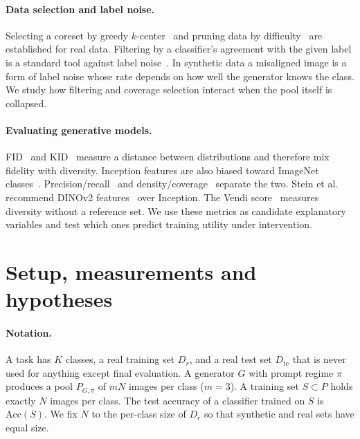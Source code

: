 \documentclass[10pt,twocolumn,letterpaper]{article}
\begin{document}
\paragraph{Data selection and label noise.} Selecting a coreset by greedy $k$-center~\cite{gonzalez1985clustering,sener2018active} and pruning data by difficulty~\cite{sorscher2022beyond} are established for real data. Filtering by a classifier's agreement with the given label is a standard tool against label noise~\cite{northcutt2021confident}. In synthetic data a misaligned image is a form of label noise whose rate depends on how well the generator knows the class. We study how filtering and coverage selection interact when the pool itself is collapsed.

\paragraph{Evaluating generative models.} FID~\cite{heusel2017gans} and KID~\cite{binkowski2018demystifying} measure a distance between distributions and therefore mix fidelity with diversity. Inception features are also biased toward ImageNet classes~\cite{kynkaanniemi2023role}. Precision/recall~\cite{kynkaanniemi2019improved} and density/coverage~\cite{naeem2020reliable} separate the two. Stein et al.~\cite{stein2023exposing} recommend DINOv2 features~\cite{oquab2024dinov2} over Inception. The Vendi score~\cite{friedman2023vendi} measures diversity without a reference set. We use these metrics as candidate explanatory variables and test which ones predict training utility under intervention.

\section{Setup, measurements and hypotheses}
\paragraph{Notation.} A task has $K$ classes, a real training set $D_r$, and a real test set $D_\text{te}$ that is never used for anything except final evaluation. A generator $G$ with prompt regime $\pi$ produces a pool $P_{G,\pi}$ of $mN$ images per class ($m{=}3$). A training set $S \subset P$ holds exactly $N$ images per class. The test accuracy of a classifier trained on $S$ is $\text{Acc}(S)$. We fix $N$ to the per-class size of $D_r$ so that synthetic and real sets have equal size.
\end{document}
